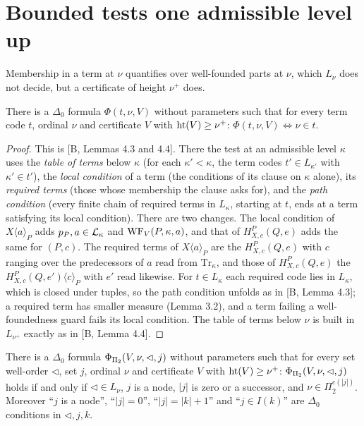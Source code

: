 \documentclass[11pt]{article}
\begin{document}
\section{Bounded tests one admissible level up}

Membership in a term at $\nu$ quantifies over well-founded parts at $\nu$, which $L_\nu$ does not decide, but a
certificate of height $\nu^+$ does.

\begin{statement} There is a $\Delta_0$ formula $\Phi(t,\nu,V)$ without parameters such that for every
term code $t$,
ordinal $\nu$ and certificate $V$ with $\mathrm{ht}(V) \ge \nu^+$: $\Phi(t,\nu,V) \iff \nu \in t$.
\end{statement}

\begin{proof}
This is [B, Lemmas 4.3 and 4.4]. There the test at an admissible level $\kappa$ uses the \emph{table of terms} below
$\kappa$ (for each $\kappa' < \kappa$, the term codes $t' \in L_{\kappa'}$ with $\kappa' \in t'$), the \emph{local
condition} of a term (the conditions of its clause on $\kappa$ alone), its \emph{required terms} (those whose
membership the clause asks for), and the \emph{path condition} (every finite chain of required terms in $L_\kappa$,
starting at $t$, ends at a term satisfying its local condition). There are two changes. The local condition of $X\langle a\rangle_P$ adds $p_P, a \in \mathcal{L}_\kappa$ and $\mathrm{WF}_V(P,\kappa,a)$, and
that of $H^P_{X,c}(Q,e)$ adds the same for $(P,c)$. The required terms of $X\langle a\rangle_P$ are the
$H^P_{X,c}(Q,e)$ with $c$ ranging over the predecessors of $a$ read from $\mathrm{Tr}_\kappa$, and those of
$H^P_{X,c}(Q,e)$ the $H^P_{X,c}(Q,e')\langle c\rangle_P$ with $e'$ read likewise. For $t \in L_\kappa$ each required
code lies in $L_\kappa$, which is closed under tuples, so the path condition unfolds as in [B, Lemma 4.3]; a required
term has smaller measure (Lemma 3.2), and a term failing a well-foundedness guard fails its local condition. The table
of terms below $\nu$ is built in $L_{\nu^+}$ exactly as in [B, Lemma 4.4].
\end{proof}

\begin{statement} There is a $\Delta_0$ formula $\Phi_{\Pi_2}(V, \nu,
\lhd, j)$ without parameters such that for every set well-order $\lhd$, set $j$, ordinal $\nu$ and certificate $V$
with $\mathrm{ht}(V) \ge \nu^+$: $\Phi_{\Pi_2}(V,\nu,\lhd,j)$ holds if and only if $\lhd \in L_\nu$, $j$ is a node, $|j|$ is zero
or a successor, and $\nu \in \Pi_2^{e(|j|)}$. Moreover ``$j$ is a node'', ``$|j| = 0$'', ``$|j| = |k|+1$'' and ``$j \in
I(k)$'' are $\Delta_0$ conditions in $\lhd, j, k$.
\end{statement}
\end{document}
